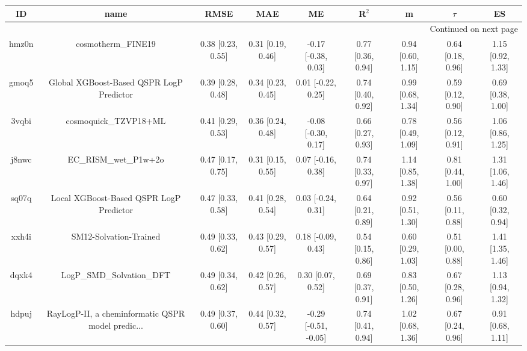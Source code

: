 \documentclass{article}
\begin{document}
\begin{center}
\scriptsize
\begin{longtable}{|ccccccccc|}
\toprule
    ID &                                               name &               RMSE &                MAE &                    ME &              R$^2$ &                    m &               $\tau$ &                    ES \\
\midrule
\endhead
\midrule
\multicolumn{9}{r}{{Continued on next page}} \\
\midrule
\endfoot

\bottomrule
\endlastfoot
 hmz0n &                                 cosmotherm\_FINE19 &  0.38 [0.23, 0.55] &  0.31 [0.19, 0.46] &   -0.17 [-0.38, 0.03] &  0.77 [0.36, 0.94] &    0.94 [0.60, 1.15] &    0.64 [0.18, 0.96] &     1.15 [0.92, 1.33] \\
 gmoq5 &           Global XGBoost-Based QSPR LogP Predictor &  0.39 [0.28, 0.48] &  0.34 [0.23, 0.45] &    0.01 [-0.22, 0.25] &  0.74 [0.40, 0.92] &    0.99 [0.68, 1.34] &    0.59 [0.12, 0.90] &     0.69 [0.38, 1.00] \\
 3vqbi &                              cosmoquick\_TZVP18+ML &  0.41 [0.29, 0.53] &  0.36 [0.24, 0.48] &   -0.08 [-0.30, 0.17] &  0.66 [0.27, 0.93] &    0.78 [0.49, 1.09] &    0.56 [0.12, 0.91] &     1.06 [0.86, 1.25] \\
 j8nwc &                              EC\_RISM\_wet\_P1w+2o &  0.47 [0.17, 0.75] &  0.31 [0.15, 0.55] &    0.07 [-0.16, 0.38] &  0.74 [0.33, 0.97] &    1.14 [0.85, 1.38] &    0.81 [0.44, 1.00] &     1.31 [1.06, 1.46] \\
 sq07q &            Local XGBoost-Based QSPR LogP Predictor &  0.47 [0.33, 0.58] &  0.41 [0.28, 0.54] &    0.03 [-0.24, 0.31] &  0.64 [0.21, 0.89] &    0.92 [0.51, 1.30] &    0.56 [0.11, 0.88] &     0.60 [0.32, 0.94] \\
 xxh4i &                             SM12-Solvation-Trained &  0.49 [0.33, 0.62] &  0.43 [0.29, 0.57] &    0.18 [-0.09, 0.43] &  0.54 [0.15, 0.86] &    0.60 [0.29, 1.03] &    0.51 [0.00, 0.88] &     1.41 [1.35, 1.46] \\
 dqxk4 &                          LogP\_SMD\_Solvation\_DFT &  0.49 [0.34, 0.62] &  0.42 [0.26, 0.57] &     0.30 [0.07, 0.52] &  0.69 [0.37, 0.91] &    0.83 [0.50, 1.26] &    0.67 [0.28, 0.96] &     1.13 [0.94, 1.32] \\
 hdpuj &  RayLogP-II, a cheminformatic QSPR model predic... &  0.49 [0.37, 0.60] &  0.44 [0.32, 0.57] &  -0.29 [-0.51, -0.05] &  0.74 [0.41, 0.94] &    1.02 [0.68, 1.36] &    0.67 [0.24, 0.96] &     0.91 [0.68, 1.11] \\

\end{longtable}
\end{center}
\end{document}
